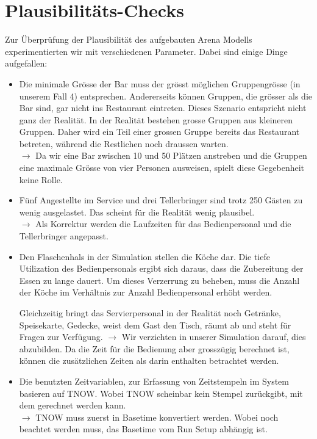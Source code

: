 \documentclass[ngerman,a4paper,12pt]{scrreprt}
\begin{document}
	\section{Plausibilitäts-Checks}
	Zur Überprüfung der Plausibilität des aufgebauten Arena Modells experimentierten wir mit verschiedenen Parameter. Dabei sind einige Dinge aufgefallen:
	\begin{itemize}
		\item Die minimale Grösse der Bar muss der grösst möglichen Gruppengrösse (in unserem Fall 4) entsprechen. Andererseits können Gruppen, die grösser als die Bar sind, gar nicht ins Restaurant eintreten.
		Dieses Szenario entspricht nicht ganz der Realität. In der Realität bestehen grosse Gruppen aus kleineren Gruppen. Daher wird ein Teil einer grossen Gruppe bereits das Restaurant betreten, während die Restlichen noch draussen warten.\\
		$\rightarrow$ Da wir eine Bar zwischen 10 und 50 Plätzen anstreben und die Gruppen eine maximale Grösse von vier Personen ausweisen, spielt diese Gegebenheit keine Rolle.
		\item Fünf Angestellte im Service und drei Tellerbringer sind trotz 250 Gästen zu wenig ausgelastet. Das scheint für die Realität wenig plausibel.\\
		$\rightarrow$ Als Korrektur werden die Laufzeiten für das Bedienpersonal und die Tellerbringer angepasst.
		\item Den Flaschenhals in der Simulation stellen die Köche dar. Die tiefe Utilization des Bedienpersonals ergibt sich daraus, dass die Zubereitung der Essen zu lange dauert. Um dieses Verzerrung zu beheben, muss die Anzahl der Köche im Verhältnis zur Anzahl Bedienpersonal erhöht werden.
		
		Gleichzeitig bringt das Servierpersonal in der Realität noch Getränke, Speisekarte, Gedecke, weist dem Gast den Tisch, räumt ab und steht für Fragen zur Verfügung.
		$\rightarrow$ Wir verzichten in unserer Simulation darauf, dies abzubilden. Da die Zeit für die Bedienung aber grosszügig berechnet ist, können die zusätzlichen Zeiten als darin enthalten betrachtet werden.
		\item Die benutzten Zeitvariablen, zur Erfassung von Zeitstempeln im System basieren auf TNOW. Wobei TNOW scheinbar kein Stempel zurückgibt, mit dem gerechnet werden kann.\\
		$\rightarrow$ TNOW muss zuerst in Basetime konvertiert werden. Wobei noch beachtet werden muss, das Basetime vom Run Setup abhängig ist.
	\end{itemize}
			
\end{document}
